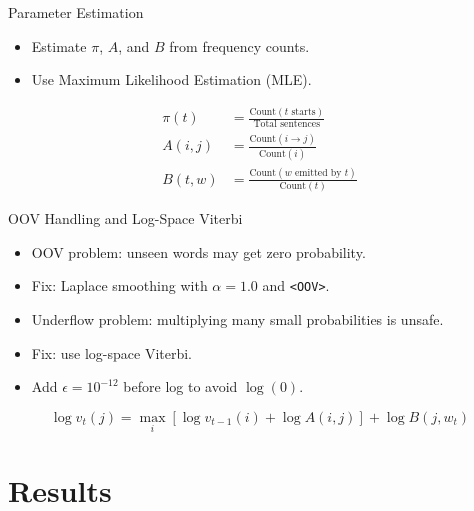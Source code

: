 \documentclass[aspectratio=169]{beamer}
\begin{document}
\begin{frame}{Parameter Estimation}
  \begin{itemize}
    \item Estimate $\pi$, $A$, and $B$ from frequency counts.
    \item Use Maximum Likelihood Estimation (MLE).
  \end{itemize}

  \begin{align*}
    \pi(t) &= \frac{\text{Count}(t \text{ starts})}{\text{Total sentences}} \\
    A(i,j) &= \frac{\text{Count}(i \rightarrow j)}{\text{Count}(i)} \\
    B(t,w) &= \frac{\text{Count}(w \text{ emitted by } t)}{\text{Count}(t)}
  \end{align*}
\end{frame}

\begin{frame}{OOV Handling and Log-Space Viterbi}
  \begin{itemize}
    \item OOV problem: unseen words may get zero probability.
    \item Fix: Laplace smoothing with $\alpha = 1.0$ and \texttt{\textless OOV\textgreater}.
    \item Underflow problem: multiplying many small probabilities is unsafe.
    \item Fix: use log-space Viterbi.
    \item Add $\epsilon = 10^{-12}$ before log to avoid $\log(0)$.
  \end{itemize}

  \begin{equation*}
    \log v_t(j) =
    \max_i \left[\log v_{t-1}(i) + \log A(i,j)\right]
    + \log B(j,w_t)
  \end{equation*}
\end{frame}

\section{Results}
\end{document}
